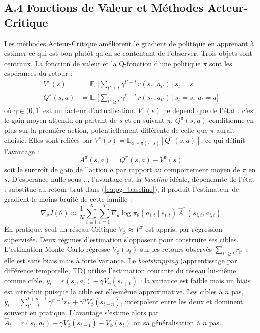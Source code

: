 \documentclass[11pt,a4paper]{article}
\begin{document}
\subsection*{A.4 Fonctions de Valeur et Méthodes Acteur-Critique}
Les méthodes Acteur-Critique améliorent le gradient de politique en apprenant à estimer ce qui est bon plutôt qu'en se contentant de l'observer. Trois objets sont centraux. La fonction de valeur et la Q-fonction d'une politique $\pi$ sont les espérances du retour :
\begin{align}
V^\pi(s) &= \mathbb{E}_\pi \Big[ \textstyle\sum_{t' \geq t} \gamma^{t'-t}\, r(s_{t'}, a_{t'}) \,\Big|\, s_t = s \Big] \\
Q^\pi(s, a) &= \mathbb{E}_\pi \Big[ \textstyle\sum_{t' \geq t} \gamma^{t'-t}\, r(s_{t'}, a_{t'}) \,\Big|\, s_t = s, \, a_t = a \Big]
\end{align}
où $\gamma \in (0, 1]$ est un facteur d'actualisation. $V^\pi(s)$ ne dépend que de l'état : c'est le gain moyen attendu en partant de $s$ et en suivant $\pi$. $Q^\pi(s,a)$ conditionne en plus sur la première action, potentiellement différente de celle que $\pi$ aurait choisie. Elles sont reliées par $V^\pi(s) = \mathbb{E}_{a \sim \pi(\cdot \mid s)}[Q^\pi(s,a)]$, ce qui définit l'avantage :
\begin{equation}
A^\pi(s, a) = Q^\pi(s, a) - V^\pi(s)
\end{equation}
soit le surcroît de gain de l'action $a$ par rapport au comportement moyen de $\pi$ en $s$. D'espérance nulle sous $\pi$, l'avantage est la \emph{baseline} idéale, dépendante de l'état : substitué au retour brut dans (\ref{eq:pg_baseline}), il produit l'estimateur de gradient le moins bruité de cette famille :
\begin{equation}
\nabla_\theta J(\theta) \approx \frac{1}{N} \sum_{i=1}^{N} \sum_{t=1}^{T} \nabla_\theta \log \pi_\theta(a_{i,t} \mid s_{i,t}) \, \hat{A}^\pi(s_{i,t}, a_{i,t})
\label{eq:actor_critic_grad}
\end{equation}
En pratique, seul un réseau Critique $V_\phi \approx V^\pi$ est appris, par régression supervisée. Deux régimes d'estimation s'opposent pour construire ses cibles. L'estimation Monte-Carlo régresse $V_\phi(s_t)$ sur les retours observés $\sum_{t' \geq t} r_{t'}$ : elle est sans biais mais à forte variance. Le \emph{bootstrapping} (apprentissage par différence temporelle, TD) utilise l'estimation courante du réseau lui-même comme cible, $y_t = r(s_t, a_t) + \gamma V_\phi(s_{t+1})$ : la variance est faible mais un biais est introduit puisque la cible est elle-même approximative. Les cibles à $n$ pas, $y_t = \sum_{t'=t}^{t+n-1} \gamma^{t'-t} r_{t'} + \gamma^n V_\phi(s_{t+n})$, interpolent entre les deux et dominent souvent en pratique. L'avantage s'estime alors par $\hat{A}_t = r(s_t, a_t) + \gamma V_\phi(s_{t+1}) - V_\phi(s_t)$ ou sa généralisation à $n$ pas.
\end{document}
